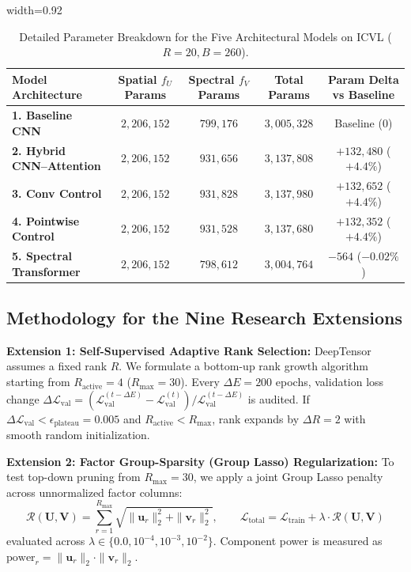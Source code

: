 \begin{table}[htbp]
\centering
\caption{Detailed Parameter Breakdown for the Five Architectural Models on ICVL ($R=20, B=260$).}
\label{tab:model_parameter_breakdown}
\begin{adjustbox}{width=0.92\textwidth}
\begin{tabular}{lcccc}
\toprule
\textbf{Model Architecture} & \textbf{Spatial $f_U$ Params} & \textbf{Spectral $f_V$ Params} & \textbf{Total Params} & \textbf{Param Delta vs Baseline} \\
\midrule
\textbf{1. Baseline CNN} & $2,206,152$ & $799,176$ & $3,005,328$ & Baseline ($0$) \\
\textbf{2. Hybrid CNN--Attention} & $2,206,152$ & $931,656$ & $3,137,808$ & $+132,480$ ($+4.4\%$) \\
\textbf{3. Conv Control} & $2,206,152$ & $931,828$ & $3,137,980$ & $+132,652$ ($+4.4\%$) \\
\textbf{4. Pointwise Control} & $2,206,152$ & $931,528$ & $3,137,680$ & $+132,352$ ($+4.4\%$) \\
\textbf{5. Spectral Transformer} & $2,206,152$ & $798,612$ & $3,004,764$ & $-564$ ($-0.02\%$) \\
\bottomrule
\end{tabular}
\end{adjustbox}
\end{table}

\subsection{Methodology for the Nine Research Extensions}
\label{subsec:extensions_methodology}

\textbf{Extension 1: Self-Supervised Adaptive Rank Selection:} DeepTensor assumes a fixed rank $R$. We formulate a bottom-up rank growth algorithm starting from $R_\text{active} = 4$ ($R_\text{max} = 30$). Every $\Delta E = 200$ epochs, validation loss change $\Delta \mathcal{L}_\text{val} = (\mathcal{L}_\text{val}^{(t-\Delta E)} - \mathcal{L}_\text{val}^{(t)}) / \mathcal{L}_\text{val}^{(t-\Delta E)}$ is audited. If $\Delta \mathcal{L}_\text{val} < \epsilon_\text{plateau} = 0.005$ and $R_\text{active} < R_\text{max}$, rank expands by $\Delta R = 2$ with smooth random initialization.

\textbf{Extension 2: Factor Group-Sparsity (Group Lasso) Regularization:} To test top-down pruning from $R_\text{max} = 30$, we apply a joint Group Lasso penalty across unnormalized factor columns:
\begin{equation}
\label{eq:group_lasso}
\mathcal{R}(\mathbf{U}, \mathbf{V}) = \sum_{r=1}^{R_\text{max}} \sqrt{\|\mathbf{u}_r\|_2^2 + \|\mathbf{v}_r\|_2^2}, \qquad \mathcal{L}_\text{total} = \mathcal{L}_\text{train} + \lambda \cdot \mathcal{R}(\mathbf{U}, \mathbf{V})
\end{equation}
evaluated across $\lambda \in \{0.0, 10^{-4}, 10^{-3}, 10^{-2}\}$. Component power is measured as $\text{power}_r = \|\mathbf{u}_r\|_2 \cdot \|\mathbf{v}_r\|_2$.

